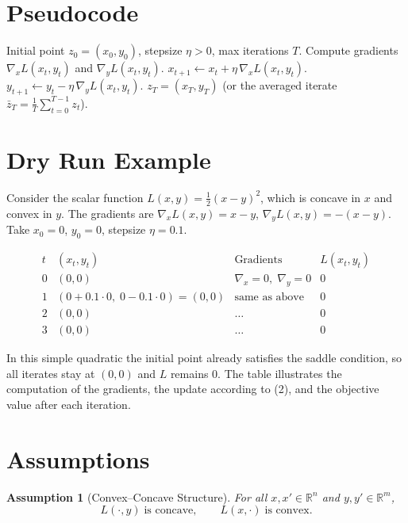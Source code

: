 \documentclass{article}
\newtheorem{assumption}{Assumption}
\begin{document}
\section*{Pseudocode}
\begin{algorithm}[H]
\caption{Gradient Descent–Ascent (GDA)}
\begin{algorithmic}[1]
\REQUIRE Initial point $z_{0}=(x_{0},y_{0})$, stepsize $\eta>0$, max iterations $T$.
    \STATE Compute gradients $\nabla_{x}L(x_{t},y_{t})$ and $\nabla_{y}L(x_{t},y_{t})$.
    \STATE $x_{t+1}\gets x_{t}+ \eta\,\nabla_{x}L(x_{t},y_{t})$.
    \STATE $y_{t+1}\gets y_{t}- \eta\,\nabla_{y}L(x_{t},y_{t})$.
\ENDFOR
\RETURN $z_{T}=(x_{T},y_{T})$ (or the averaged iterate $\bar z_{T}=\frac1T\sum_{t=0}^{T-1}z_{t}$).
\end{algorithmic}
\end{algorithm}

\section*{Dry Run Example}
Consider the scalar function $L(x,y)=\tfrac12(x-y)^{2}$, which is concave in $x$ and convex in $y$.  
The gradients are $\nabla_{x}L(x,y)=x-y$, $\nabla_{y}L(x,y)=-(x-y)$.  
Take $x_{0}=0$, $y_{0}=0$, stepsize $\eta=0.1$.

\[
\begin{array}{c|c|c|c}
t & (x_{t},y_{t}) & \text{Gradients} & L(x_{t},y_{t})\\ \hline
0 & (0,0) & \nabla_{x}=0,\;\nabla_{y}=0 & 0\\
1 & (0+0.1\cdot0,\;0-0.1\cdot0)=(0,0) & \text{same as above} & 0\\
2 & (0,0) & \dots & 0\\
3 & (0,0) & \dots & 0
\end{array}
\]

In this simple quadratic the initial point already satisfies the saddle condition, so all iterates stay at $(0,0)$ and $L$ remains $0$. The table illustrates the computation of the gradients, the update according to (2), and the objective value after each iteration.

\newpage

\section*{Assumptions}
\begin{assumption}[Convex–Concave Structure]\label{ass:cc}
For all $x,x'\in\mathbb{R}^{n}$ and $y,y'\in\mathbb{R}^{m}$,
\[
L(\cdot ,y)\;\text{is concave},\qquad
L(x,\cdot )\;\text{is convex}.
\]
\end{assumption}
\end{document}
